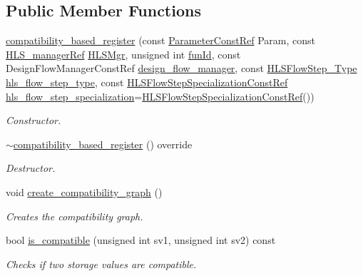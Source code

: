 \subsection*{Public Member Functions}
\begin{DoxyCompactItemize}
\item 
\hyperlink{classcompatibility__based__register_ae7bf29c0536a7a36c144258b953d8660}{compatibility\+\_\+based\+\_\+register} (const \hyperlink{Parameter_8hpp_a37841774a6fcb479b597fdf8955eb4ea}{Parameter\+Const\+Ref} Param, const \hyperlink{hls__manager_8hpp_acd3842b8589fe52c08fc0b2fcc813bfe}{H\+L\+S\+\_\+manager\+Ref} \hyperlink{classHLS__step_ade85003a99d34134418451ddc46a18e9}{H\+L\+S\+Mgr}, unsigned int \hyperlink{classHLSFunctionStep_a3e6434fd86c698b0c70520b859bff5b0}{fun\+Id}, const Design\+Flow\+Manager\+Const\+Ref \hyperlink{classDesignFlowStep_ab770677ddf087613add30024e16a5554}{design\+\_\+flow\+\_\+manager}, const \hyperlink{hls__step_8hpp_ada16bc22905016180e26fc7e39537f8d}{H\+L\+S\+Flow\+Step\+\_\+\+Type} \hyperlink{classHLS__step_aefd59af15346ec3f10bf12bd756e6777}{hls\+\_\+flow\+\_\+step\+\_\+type}, const \hyperlink{hls__step_8hpp_a5fdd2edf290c196531d21d68e13f0e74}{H\+L\+S\+Flow\+Step\+Specialization\+Const\+Ref} \hyperlink{classHLS__step_a843be75ba53b81876aa3c8b870ae8a55}{hls\+\_\+flow\+\_\+step\+\_\+specialization}=\hyperlink{hls__step_8hpp_a5fdd2edf290c196531d21d68e13f0e74}{H\+L\+S\+Flow\+Step\+Specialization\+Const\+Ref}())
\begin{DoxyCompactList}\small\item\em Constructor. \end{DoxyCompactList}\item 
\hyperlink{classcompatibility__based__register_a7b452ff93b003cd5988c2dae51bf3077}{$\sim$compatibility\+\_\+based\+\_\+register} () override
\begin{DoxyCompactList}\small\item\em Destructor. \end{DoxyCompactList}\item 
void \hyperlink{classcompatibility__based__register_afe19d2dd6d74dd1cee14ef01a3035c8e}{create\+\_\+compatibility\+\_\+graph} ()
\begin{DoxyCompactList}\small\item\em Creates the compatibility graph. \end{DoxyCompactList}\item 
bool \hyperlink{classcompatibility__based__register_aa23fe5b86c033e8d6cee7cd85d559d57}{is\+\_\+compatible} (unsigned int sv1, unsigned int sv2) const
\begin{DoxyCompactList}\small\item\em Checks if two storage values are compatible. \end{DoxyCompactList}\end{DoxyCompactItemize}
